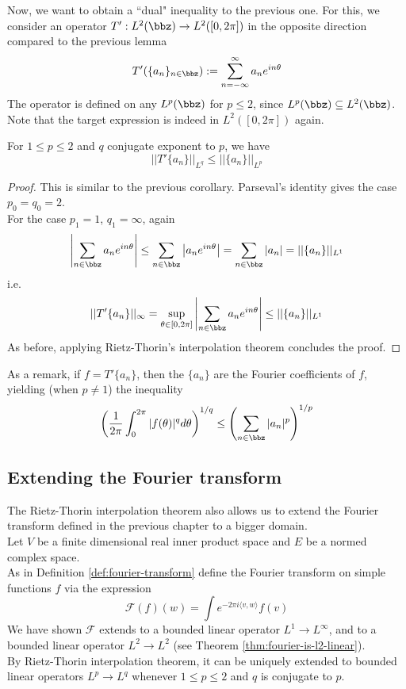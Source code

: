 Now, we want to obtain a ``dual" inequality to the previous one. For this, we consider an operator $T':L^2(\bbz) \to L^2([0, 2\pi])$ in the opposite direction compared to the previous lemma
\[ T' (\{a_n\}_{n\in \bbz}) := \sum_{n=-\infty}^{\infty} a_n e^{in\theta} \]
The operator is defined on any $L^p(\bbz)$ for $p\leq 2$, since $L^p(\bbz) \subseteq L^2(\bbz)$.
Note that the target expression is indeed in $L^2([0, 2\pi])$ again.

\begin{lemma}
    \label{lem:hausdorff_young_dual}
    For $1\leq p \leq 2$ and $q$ conjugate exponent to $p$, we have
    \[ ||T' \{a_n\}||_{L^q} \leq ||\{a_n\}||_{L^p} \]

    \end{lemma}
      \begin{proof}
      This is similar to the previous corollary. Parseval's identity gives the case $p_0=q_0=2$.\\
      For the case $p_1=1$, $q_1=\infty$, again
      \[ \left| \sum_{n\in \bbz} a_n e^{in\theta} \right| \leq \sum_{n\in \bbz} \left| a_n e^{in\theta} \right| = \sum_{n\in \bbz} |a_n| = ||\{a_n\}||_{L^1} \]
      i.e.
      \[ ||T'\{a_n\}||_{\infty} = \sup_{\theta \in [0, 2\pi]}  \left| \sum_{n\in \bbz} a_n e^{in\theta} \right| \leq ||\{a_n\}||_{L^1}  \]
      As before, applying Rietz-Thorin's interpolation theorem concludes the proof.
    \end{proof}

As a remark, if $f= T'\{a_n\}$, then the $\{a_n\}$ are the Fourier coefficients of $f$, yielding (when $p\neq 1$) the inequality
\[ \left( \frac{1}{2\pi} \int_0^{2\pi} |f(\theta)|^q d\theta \right)^{1/q} \leq \left( \sum_{n\in \bbz} |a_n|^p \right)^{1/p} \]

\subsection{Extending the Fourier transform}
The Rietz-Thorin interpolation theorem also allows us to extend the Fourier transform defined in the previous chapter to a bigger domain.\\
Let $V$ be a finite dimensional real inner product space and $E$ be a normed complex space.\\
As in Definition \ref{def:fourier-transform} define the Fourier transform on simple functions $f$ via the expression
\[ \mathcal{F} (f)(w) = \int e^{-2\pi i \langle v, w \rangle } f(v) \]
We have shown $\mathcal{F}$ extends to a bounded linear operator $L^1 \to L^{\infty}$, and to a bounded linear operator $L^2 \to L^2$ (see Theorem \ref{thm:fourier-is-l2-linear}).\\
By Rietz-Thorin interpolation theorem, it can be uniquely extended to bounded linear operators $L^p \to L^q$
whenever $1\leq p \leq 2$ and $q$ is conjugate to $p$.

